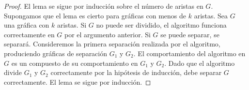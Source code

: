 \begin{proof}
El lema se sigue por inducción sobre el número de aristas en $G$. Supongamos que el lema es cierto para gráficas con menos de $k$ aristas. Sea $G$ una gráfica con $k$ aristas. Si $G$ no puede ser dividido, el algoritmo funciona correctamente en $G$ por el argumento anterior. Si $G$ se puede separar, se separará. Consideremos la primera separación realizada por el algoritmo, produciendo gráficas de separación $G_{1}$ y $G_{2}$. El comportamiento del algoritmo en $G$ es un compuesto de su comportamiento en $G_{1}$ y $G_{2}$. Dado que el algoritmo divide $G_{1}$ y $G_{2}$ correctamente por la hipótesis de inducción, debe separar $G$ correctamente. El lema se sigue por inducción.
\end{proof}

\begin{figure}[H]
    \begin{subfigure}[b]{0.3\textwidth}
        \begin{minipage}{7cm}
        \centering%
        \end{minipage}
      \end{subfigure}
      \begin{subfigure}[b]{0.3\textwidth}
        \begin{minipage}{7cm}
        \centering%
        \end{minipage}
      \end{subfigure}

\end{figure}
